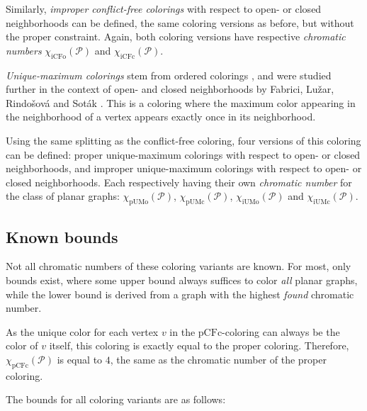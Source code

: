 \documentclass{article}
\begin{document}
Similarly, \textit{improper conflict-free colorings} with respect to open- or closed neighborhoods can be defined, the same coloring versions as before, but without the proper constraint. Again, both coloring versions have respective \textit{chromatic numbers} $\chi_{\mathrm{iCFo}}(\mathcal{P})$ and $\chi_{\mathrm{iCFc}}(\mathcal{P})$.

\textit{Unique-maximum colorings} stem from ordered colorings \cite{KATCHALSKI1995141}, and were studied further in the context of open- and closed neighborhoods by Fabrici, Lužar, Rindošová and Soták \cite{fabrici2023proper}. This is a coloring where the maximum color appearing in the neighborhood of a vertex appears exactly once in its neighborhood.

Using the same splitting as the conflict-free coloring, four versions of this coloring can be defined: proper unique-maximum colorings with respect to open- or closed neighborhoods, and improper unique-maximum colorings with respect to open- or closed neighborhoods. Each respectively having their own \textit{chromatic number} for the class of planar graphs: $\chi_{\mathrm{pUMo}}(\mathcal{P})$, $\chi_{\mathrm{pUMc}}(\mathcal{P})$, $\chi_{\mathrm{iUMo}}(\mathcal{P})$ and $\chi_{\mathrm{iUMc}}(\mathcal{P})$.

\subsection{Known bounds}
\label{sec:bounds}

Not all chromatic numbers of these coloring variants are known. For most, only bounds exist, where some upper bound always suffices to color \textit{all} planar graphs, while the lower bound is derived from a graph with the highest \textit{found} chromatic number. 

As the unique color for each vertex $v$ in the $\mathrm{pCFc}$-coloring can always be the color of $v$ itself, this coloring is exactly equal to the proper coloring. Therefore, $\chi_{\mathrm{pCFc}}(\mathcal{P})$ is equal to $4$, the same as the chromatic number of the proper coloring.

The bounds for all coloring variants are as follows:
\end{document}
